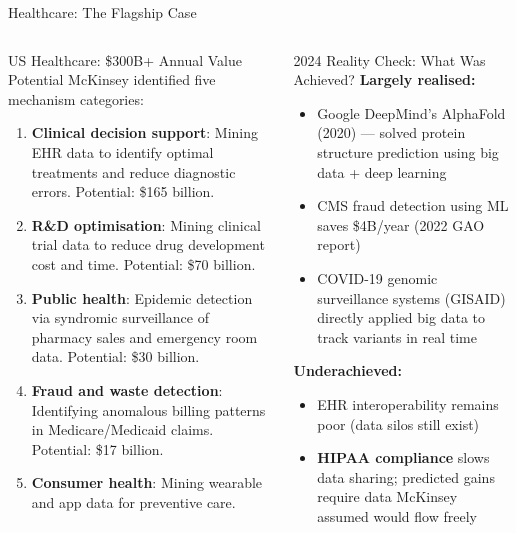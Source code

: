 \documentclass[aspectratio=169,10pt]{beamer}
\begin{document}
\begin{frame}{Healthcare: The Flagship Case}
  \begin{columns}[T]
      \begin{block}{US Healthcare: \$300B+ Annual Value Potential}
        McKinsey identified five mechanism categories:
        \vspace{4pt}
        \begin{enumerate}
          \item \textbf{Clinical decision support}: Mining EHR data to identify optimal treatments and reduce diagnostic errors. Potential: \$165 billion.
          \item \textbf{R\&D optimisation}: Mining clinical trial data to reduce drug development cost and time.  Potential: \$70 billion.
          \item \textbf{Public health}: Epidemic detection via syndromic surveillance of pharmacy sales and emergency room data.  Potential: \$30 billion.
          \item \textbf{Fraud and waste detection}: Identifying anomalous billing patterns in Medicare/Medicaid claims.  Potential: \$17 billion.
          \item \textbf{Consumer health}: Mining wearable and app data for preventive care.
        \end{enumerate}
      \end{block}

      \begin{exampleblock}{2024 Reality Check: What Was Achieved?}
        \small
        \textbf{Largely realised:}
        \begin{itemize}
          \item Google DeepMind's AlphaFold (2020) --- solved protein structure prediction using big data + deep learning
          \item CMS fraud detection using ML saves \$4B/year (2022 GAO report)
          \item COVID-19 genomic surveillance systems (GISAID) directly applied big data to track variants in real time
        \end{itemize}
        \vspace{4pt}
        \textbf{Underachieved:}
        \begin{itemize}
          \item EHR interoperability remains poor (data silos still exist)
          \item \textbf{HIPAA compliance} slows data sharing; predicted gains require data McKinsey assumed would flow freely
        \end{itemize}
      \end{exampleblock}
  \end{columns}
\end{frame}
\end{document}
